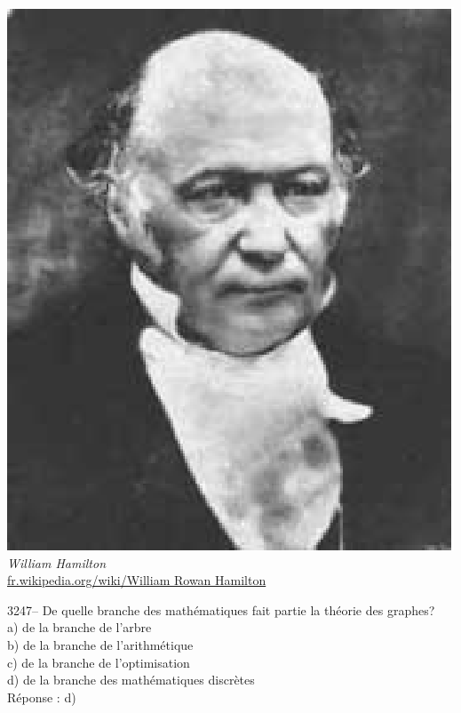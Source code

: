\documentclass[letterpaper, 12pt]{article}
\begin{document}
\begin{center}
\includegraphics[scale=0.45]{WilliamRowanHamilton.eps}\\
\emph{{\small William Hamilton}}\\
\href{http://fr.wikipedia.org/wiki/William_Rowan_Hamilton}{fr.wikipedia.org/wiki/William Rowan Hamilton}\\[5mm]
\end{center}



3247-- De quelle branche des math\'ematiques fait partie la th\'eorie des graphes?\\

a) de la branche de l'arbre\\
b) de la branche de l'arithm\'etique\\
c) de la branche de l'optimisation\\
d) de la branche des math\'ematiques discr\`etes\\

R\'eponse : d)\\
\end{document}
